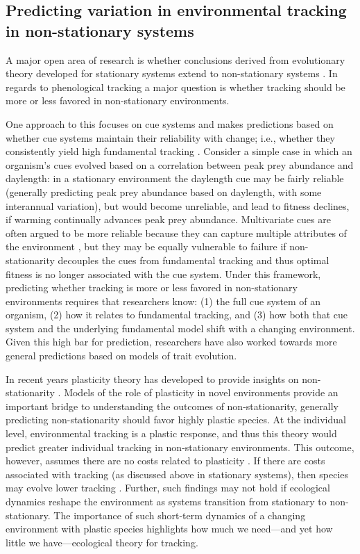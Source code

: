 \documentclass[11pt,letterpaper]{article}
\begin{document}
\subsection{Predicting variation in environmental tracking in non-stationary systems}
A major open area of research is whether conclusions derived from evolutionary theory developed for stationary systems extend to non-stationary systems \citep{chevin2010}. In regards to phenological tracking a major question is whether tracking should be more or less favored in non-stationary environments. 

One approach to this focuses on cue systems and makes predictions based on whether cue systems maintain their reliability with change; i.e., whether they consistently yield high fundamental tracking \citep{bonamour2019}. Consider a simple case in which an organism's cues evolved based on a correlation between peak prey abundance and daylength: in a stationary environment the daylength cue may be fairly reliable (generally predicting peak prey abundance based on daylength, with some interannual variation), but would become unreliable, and lead to fitness declines, if warming continually advances peak prey abundance. Multivariate cues are often argued to be more reliable because they can capture multiple attributes of the environment \citep{dore2018,bonamour2019}, but they may be equally vulnerable to failure if non-stationarity decouples the cues from fundamental tracking \citep{bonamour2019} and thus optimal fitness is no longer associated with the cue system. Under this framework, predicting whether tracking is more or less favored in non-stationary environments requires that researchers know: (1) the full cue system of an organism, (2) how it relates to fundamental tracking, and (3) how both that cue system and the underlying fundamental model shift with a changing environment. Given this high bar for prediction, researchers have also worked towards more general predictions based on models of trait evolution.

In recent years plasticity theory has developed to provide insights on non-stationarity \citep[or `sustained environmental change,' see][]{chevin2010}. Models of the role of plasticity in novel environments provide an important bridge to understanding the outcomes of non-stationarity, generally predicting non-stationarity should favor highly plastic species. At the individual level, environmental tracking is a plastic response, and thus this theory would predict greater individual tracking in non-stationary environments. This outcome, however, assumes there are no costs related to plasticity \citep{Ghalambor2007,tufto2015}. If there are costs associated with tracking (as discussed above in stationary systems), then species may evolve lower tracking \citep{auld2010}. Further, such findings may not hold if ecological dynamics reshape the environment as systems transition from stationary to non-stationary. The importance of such short-term dynamics of a changing environment with plastic species highlights how much we need---and yet how little we have---ecological theory for tracking.
\end{document}
